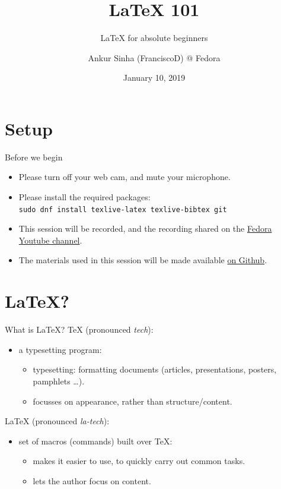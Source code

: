 \documentclass[usenames,dvipsnames]{beamer}
\title[\LaTeX{}]{\LaTeX{} 101}
\subtitle{\LaTeX{} for absolute beginners}
\author[ankursinha: FranciscoD]{Ankur Sinha (FranciscoD) @ Fedora}
\date{January 10, 2019}
\begin{document}
\begin{frame}
  \titlepage{}
\end{frame}

\section{Setup}
\begin{frame}[c]{Before we begin}
  \begin{itemize}
    \item Please turn off your web cam, and mute your microphone.
    \item Please install the required packages:\\ \texttt{sudo dnf install texlive-latex texlive-bibtex git}
    \item This session will be recorded, and the recording shared on the \href{https://www.youtube.com/channel/UCnIfca4LPFVn8-FjpPVc1ow}{Fedora Youtube channel}.
    \item The materials used in this session will be made available \href{https://github.com/sanjayankur31/20190110-LaTeX-101}{on Github}.
  \end{itemize}
\end{frame}
\section{\LaTeX{}?}
\begin{frame}[c]{What is \LaTeX{}?}
  \TeX{} (pronounced \emph{tech})\footnotemark:
  \begin{itemize}
    \item a \alert{typesetting} program:
      \begin{itemize}
        \item typesetting: formatting documents (articles, presentations, posters, pamphlets \ldots).
        \item focusses on appearance, rather than structure/content.
      \end{itemize}
  \end{itemize}
  \pause{}
  \LaTeX{} (pronounced \emph{la-tech})\footnotemark:
  \begin{itemize}
    \item set of \alert{macros} (commands) built over \TeX{}:
      \begin{itemize}
        \item makes it easier to use, to quickly carry out common tasks.
        \item lets the author focus on content.
      \end{itemize}
  \end{itemize}
\end{frame}
\end{document}

